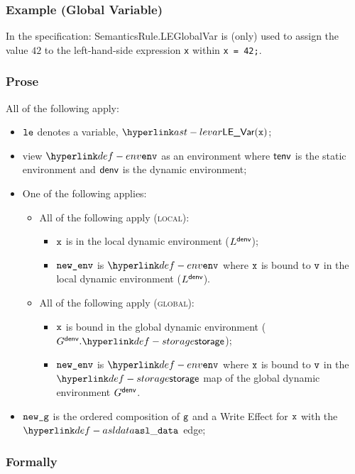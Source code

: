 \subsubsection{Example (Global Variable)}
In the specification:
SemanticsRule.LEGlobalVar is (only) used to assign the value $42$ to the left-hand-side expression
\texttt{x} within \texttt{x = 42;}.

\subsubsection{Prose}
All of the following apply:
\begin{itemize}
    \item $\vle$ denotes a variable, $\LEVar(\vx)$;
    \item view $\env$ as an environment where $\tenv$ is the static environment and $\denv$ is the dynamic environment;
    \item One of the following applies:
    \begin{itemize}
        \item All of the following apply (\textsc{local}):
        \begin{itemize}
            \item $\vx$ is in the local dynamic environment ($L^\denv$);
            \item $\newenv$ is $\env$ where $\vx$ is bound to $\vv$ in the local dynamic environment ($L^\denv$).
        \end{itemize}

        \item All of the following apply (\textsc{global}):
        \begin{itemize}
            \item $\vx$ is bound in the global dynamic environment ($G^\denv.\storage$);
            \item $\newenv$ is $\env$ where $\vx$ is bound to $\vv$ in the $\storage$ map of the global dynamic environment $G^\denv$.
        \end{itemize}
    \end{itemize}
    \item $\newg$ is the ordered composition of $\vg$ and a Write Effect for $\vx$ with the $\asldata$ edge;
\end{itemize}

\subsubsection{Formally}
\begin{mathpar}
\end{mathpar}

